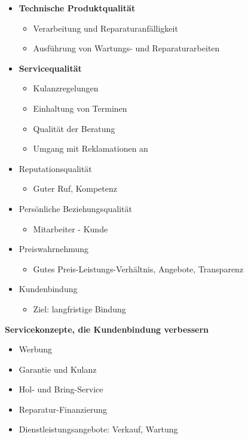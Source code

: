 \begin{itemize}
\item
  \textbf{Technische Produktqualität}

  \begin{itemize}
  \item
    Verarbeitung und Reparaturanfälligkeit
  \item
    Ausführung von Wartungs- und Reparaturarbeiten
  \end{itemize}
\item
  \textbf{Servicequalität}

  \begin{itemize}
  \item
    Kulanzregelungen
  \item
    Einhaltung von Terminen
  \item
    Qualität der Beratung
  \item
    Umgang mit Reklamationen an
  \end{itemize}
\item
  Reputationsqualität

  \begin{itemize}
  \item
    Guter Ruf, Kompetenz
  \end{itemize}
\item
  Persönliche Beziehungsqualität

  \begin{itemize}
  \item
    Mitarbeiter - Kunde
  \end{itemize}
\item
  Preiswahrnehmung

  \begin{itemize}
  \item
    Gutes Preis-Leistungs-Verhältnis, Angebote, Transparenz
  \end{itemize}
\item
  Kundenbindung

  \begin{itemize}
  \item
    Ziel: langfristige Bindung
  \end{itemize}
\end{itemize}

\textbf{Servicekonzepte, die Kundenbindung verbessern}

\begin{itemize}
\item
  Werbung
\item
  Garantie und Kulanz
\item
  Hol- und Bring-Service
\item
  Reparatur-Finanzierung
\item
  Dienstleistungsangebote: Verkauf, Wartung
\end{itemize}

